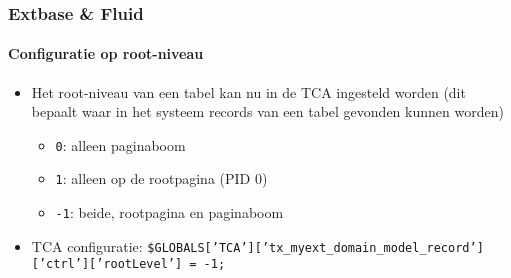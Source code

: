 \begin{frame}[fragile]
	\frametitle{Extbase \& Fluid}
	\framesubtitle{Configuratie op root-niveau}

	\lstset{basicstyle=\small\ttfamily}

	\begin{itemize}

		\item Het root-niveau van een tabel kan nu in de TCA ingesteld worden\newline
			\small(dit bepaalt waar in het systeem records van een tabel gevonden kunnen worden)\normalsize

			\begin{itemize}
				\item \texttt{0}: alleen paginaboom
				\item \texttt{1}: alleen op de rootpagina (PID 0)
				\item \texttt{-1}: beide, rootpagina en paginaboom
			\end{itemize}

		\item TCA configuratie:\newline
			\tiny
				\texttt{\$GLOBALS['TCA']['tx\_myext\_domain\_model\_record']['ctrl']['rootLevel'] = -1;}
			\normalsize

	\end{itemize}

\end{frame}

